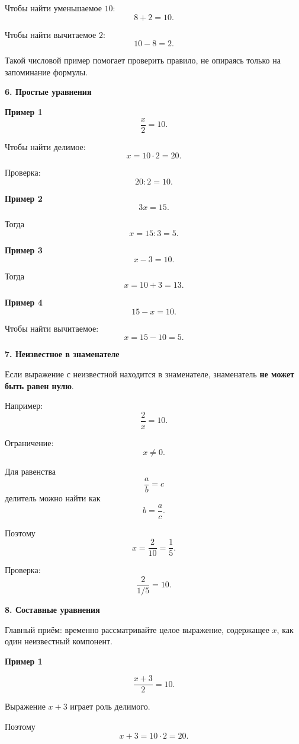 \documentclass[a4paper,12pt]{article}
\newcommand{\subhead}[1]{%
    \vspace{0.25em}
    {\large\bfseries\textcolor{darkaccent}{#1}}\par
    \vspace{0.1em}
}
\begin{document}
Чтобы найти уменьшаемое $10$:
\[
8+2=10.
\]

Чтобы найти вычитаемое $2$:
\[
10-8=2.
\]

Такой числовой пример помогает проверить правило,
не опираясь только на запоминание формулы.


\subhead{6. Простые уравнения}

\textbf{Пример 1}
\[
\frac{x}{2}=10.
\]

Чтобы найти делимое:
\[
x=10\cdot2=20.
\]

Проверка:
\[
20:2=10.
\]

\textbf{Пример 2}
\[
3x=15.
\]

Тогда
\[
x=15:3=5.
\]

\textbf{Пример 3}
\[
x-3=10.
\]

Тогда
\[
x=10+3=13.
\]

\textbf{Пример 4}
\[
15-x=10.
\]

Чтобы найти вычитаемое:
\[
x=15-10=5.
\]


\subhead{7. Неизвестное в знаменателе}

Если выражение с неизвестной находится
в знаменателе, знаменатель
\textbf{не может быть равен нулю}.

Например:
\[
\frac{2}{x}=10.
\]

Ограничение:
\[
x\ne0.
\]

Для равенства
\[
\frac{a}{b}=c
\]
делитель можно найти как
\[
b=\frac{a}{c}.
\]

Поэтому
\[
x=\frac{2}{10}
=\frac15.
\]

Проверка:
\[
\frac{2}{1/5}=10.
\]


\subhead{8. Составные уравнения}

Главный приём:
временно рассматривайте целое выражение,
содержащее $x$,
как один неизвестный компонент.

\textbf{Пример 1}

\[
\frac{x+3}{2}=10.
\]

Выражение $x+3$ играет роль делимого.

Поэтому
\[
x+3=10\cdot2=20.
\]
\end{document}
